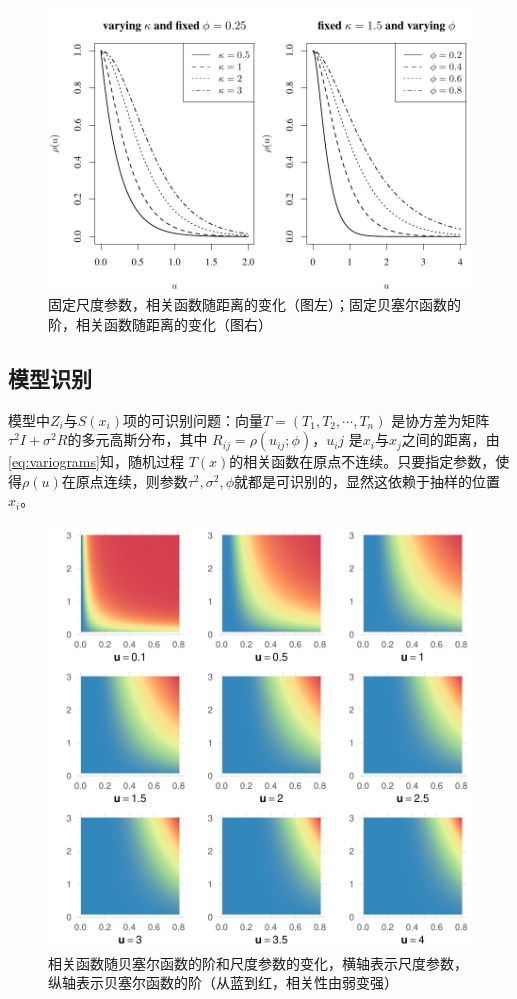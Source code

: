 \documentclass[hyperref, a4paper, UTF8, zihao = -4, linespread = 1.25, scheme = chinese]{ctexbook}
\begin{document}
\begin{figure}

{\centering \includegraphics[width=0.7\linewidth]{figures/matern} 

}

\caption{固定尺度参数，相关函数随距离的变化（图左）；固定贝塞尔函数的阶，相关函数随距离的变化（图右）}\label{fig:matern-2d}
\end{figure}

\subsection{模型识别}

模型中\(Z_{i}\)与\(S(x_i)\)项的可识别问题：向量\(T=(T_1,T_2,\cdots,T_n)\)
是协方差为矩阵 \(\tau^2I+\sigma^2R\)的多元高斯分布，其中
\(R_{ij}=\rho(u_{ij};\phi)\)，\(u_ij\)
是\(x_i\)与\(x_j\)之间的距离，由\eqref{eq:variograms}知，随机过程
\(T(x)\)的相关函数在原点不连续。只要指定参数，使得\(\rho(u)\)在原点连续，则参数\(\tau^2,\sigma^2,\phi\)就都是可识别的，显然这依赖于抽样的位置\(x_i\)\citep{Diggle2002}。
\newpage

\begin{figure}

{\centering \includegraphics[width=0.7\linewidth]{figures/matern-3d} 

}

\caption{相关函数随贝塞尔函数的阶和尺度参数的变化，横轴表示尺度参数，纵轴表示贝塞尔函数的阶（从蓝到红，相关性由弱变强）}\label{fig:matern-3d}
\end{figure}
\end{document}
